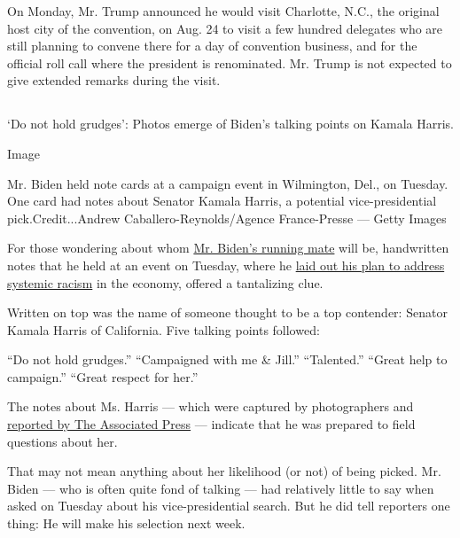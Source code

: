 On Monday, Mr. Trump announced he would visit Charlotte, N.C., the
original host city of the convention, on Aug. 24 to visit a few hundred
delegates who are still planning to convene there for a day of
convention business, and for the official roll call where the president
is renominated. Mr. Trump is not expected to give extended remarks
during the visit.

\hypertarget{-3}{%
\subsection{}\label{-3}}

`Do not hold grudges': Photos emerge of Biden's talking points on Kamala
Harris.

Image

Mr. Biden held note cards at a campaign event in Wilmington, Del., on
Tuesday. One card had notes about Senator Kamala Harris, a potential
vice-presidential pick.Credit...Andrew Caballero-Reynolds/Agence
France-Presse --- Getty Images

For those wondering about whom
\href{https://www.nytimes3xbfgragh.onion/article/biden-vice-president-2020.html}{Mr.
Biden's running mate} will be, handwritten notes that he held at an
event on Tuesday, where he
\href{https://www.nytimes3xbfgragh.onion/2020/07/28/us/politics/joe-biden-racial-justice-economy-plan.html}{laid
out his plan to address systemic racism} in the economy, offered a
tantalizing clue.

Written on top was the name of someone thought to be a top contender:
Senator Kamala Harris of California. Five talking points followed:

``Do not hold grudges.'' ``Campaigned with me \& Jill.'' ``Talented.''
``Great help to campaign.'' ``Great respect for her.''

The notes about Ms. Harris --- which were captured by photographers and
\href{https://apnews.com/d3fc8b88cde56bac9f1e7b5e494fb019}{reported by
The Associated Press} --- indicate that he was prepared to field
questions about her.

That may not mean anything about her likelihood (or not) of being
picked. Mr. Biden --- who is often quite fond of talking --- had
relatively little to say when asked on Tuesday about his
vice-presidential search. But he did tell reporters one thing: He will
make his selection next week.

\hypertarget{-4}{%
\subsection{}\label{-4}}

